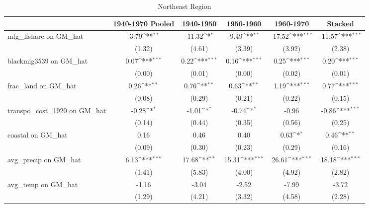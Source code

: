 \begin{table}[htbp]\centering
\def\sym#1{\ifmmode^{#1}\else\(^{#1}\)\fi}
\caption{Northeast Region}
\begin{tabular}{l*{5}{c}}
\toprule
                &\multicolumn{1}{c}{1940-1970 Pooled}&\multicolumn{1}{c}{1940-1950}&\multicolumn{1}{c}{1950-1960}&\multicolumn{1}{c}{1960-1970}&\multicolumn{1}{c}{Stacked}\\
\midrule
mfg\_lfshare on GM\_hat&    -3.79\sym{**} &   -11.32\sym{*}  &    -9.49\sym{**} &   -17.52\sym{***}&   -11.57\sym{***}\\
                &   (1.32)         &   (4.61)         &   (3.39)         &   (3.92)         &   (2.38)         \\
\addlinespace
blackmig3539 on GM\_hat&     0.07\sym{***}&     0.22\sym{***}&     0.16\sym{***}&     0.25\sym{***}&     0.20\sym{***}\\
                &   (0.00)         &   (0.01)         &   (0.00)         &   (0.02)         &   (0.01)         \\
\addlinespace
frac\_land on GM\_hat&     0.26\sym{**} &     0.76\sym{**} &     0.63\sym{**} &     1.19\sym{***}&     0.77\sym{***}\\
                &   (0.08)         &   (0.29)         &   (0.21)         &   (0.22)         &   (0.15)         \\
\addlinespace
transpo\_cost\_1920 on GM\_hat&    -0.28\sym{*}  &    -1.01\sym{*}  &    -0.74\sym{*}  &    -0.96         &    -0.86\sym{***}\\
                &   (0.14)         &   (0.44)         &   (0.35)         &   (0.56)         &   (0.25)         \\
\addlinespace
coastal on GM\_hat&     0.16         &     0.46         &     0.40         &     0.63\sym{*}  &     0.46\sym{**} \\
                &   (0.09)         &   (0.30)         &   (0.23)         &   (0.29)         &   (0.16)         \\
\addlinespace
avg\_precip on GM\_hat&     6.13\sym{***}&    17.68\sym{**} &    15.31\sym{***}&    26.61\sym{***}&    18.18\sym{***}\\
                &   (1.41)         &   (5.83)         &   (4.00)         &   (4.92)         &   (2.82)         \\
\addlinespace
avg\_temp on GM\_hat&    -1.16         &    -3.04         &    -2.52         &    -7.99         &    -3.72         \\
                &   (1.29)         &   (4.21)         &   (3.32)         &   (4.58)         &   (2.28)         \\

\end{tabular}
\end{table}
